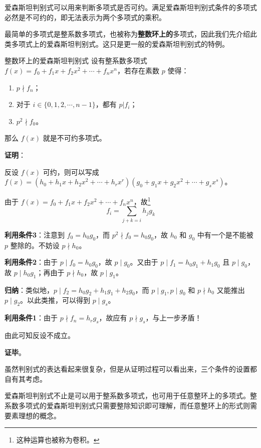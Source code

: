 
爱森斯坦判别式可以用来判断多项式是否可约。满足爱森斯坦判别式条件的多项式必然是不可约的，即无法表示为两个多项式的乘积。

最简单的多项式是整系数多项式，也被称为\textbf{整数环上的}多项式，因此我们先介绍此类多项式上的爱森斯坦判别式。这只是更一般的爱森斯坦判别式的特例。

\begin{theorem}{整数环上的爱森斯坦判别式}\label{EsstCr_the1}
设有整系数多项式 $f(x)=f_0+f_1x+f_2x^2+\cdots+f_nx^n$，若存在素数 $p$ 使得：
\begin{enumerate}
\item $p\nmid f_n$；
\item 对于 $i\in\{0, 1, 2, \cdots, n-1\}$，都有 $p|f_i$；
\item $p^2\nmid f_0$。
\end{enumerate}
那么 $f(x)$ 就是不可约多项式。
\end{theorem}

\textbf{证明}：

反设 $f(x)$ 可约，则可以写成 $f(x)=(h_0+h_1x+h_2x^2+\cdots+h_rx^r)(g_0+g_1x+g_2x^2+\cdots+g_sx^s)$。

由于 $f(x)=f_0+f_1x+f_2x^2+\cdots+f_nx^n$，故\footnote{这种运算也被称为卷积。}\begin{equation}f_i=\sum\limits_{j+k=i}h_jg_k\end{equation}

\textbf{利用条件3}：注意到 $f_0=h_0g_0$，而 $p^2\nmid f_0=h_0g_0$，故 $h_0$ 和 $g_0$ 中有一个是不能被 $p$ 整除的。不妨设 $p\nmid h_0$。

\textbf{利用条件2}：由于 $p\mid f_0=h_0g_0$，故 $p\mid g_0$。又由于 $p\mid f_1=h_0g_1+h_1g_0$ 且 $p\mid g_0$，故 $p\mid h_0g_1$；再由于 $p\nmid h_0$，故 $p\mid g_1$。

\textbf{归纳}：类似地，$p\mid f_2=h_0g_2+h_1g_1+h_2g_0$，而 $p\mid g_1, p\mid g_0$ 和 $p\nmid h_0$ 又能推出 $p\mid g_2$。以此类推，可以得到 $p\mid g_s$。

\textbf{利用条件1}：由于 $p\nmid f_n=h_rg_s$，故应有 $p\nmid g_s$，与上一步矛盾！

由此可知反设不成立。

\textbf{证毕}。

虽然判别式的表达看起来很复杂，但是从证明过程可以看出来，三个条件的设置都自有其考虑。

爱森斯坦判别式不止是可以用于整系数多项式，也可用于任意整环上的多项式。整系数多项式的爱森斯坦判别式只需要整除知识即可理解，而任意整环上的形式则需要素理想的概念。

